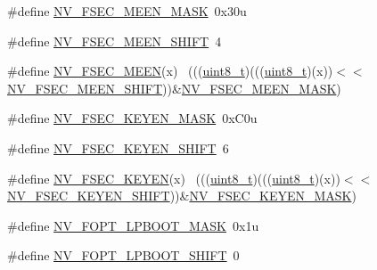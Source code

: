 \begin{DoxyCompactItemize}
\item 
\#define \hyperlink{group___n_v___register___masks_ga02f5aa86e1f5bceefd0378fa736d5656}{N\+V\+\_\+\+F\+S\+E\+C\+\_\+\+M\+E\+E\+N\+\_\+\+M\+A\+SK}~0x30u
\item 
\#define \hyperlink{group___n_v___register___masks_ga13adfbdf46af9e59b446d17ce90b49c1}{N\+V\+\_\+\+F\+S\+E\+C\+\_\+\+M\+E\+E\+N\+\_\+\+S\+H\+I\+FT}~4
\item 
\#define \hyperlink{group___n_v___register___masks_gafb2cb85643ad7aa0997ed49baa90379f}{N\+V\+\_\+\+F\+S\+E\+C\+\_\+\+M\+E\+EN}(x)                                                ~(((\hyperlink{_p_e___types_8h_aba7bc1797add20fe3efdf37ced1182c5}{uint8\+\_\+t})(((\hyperlink{_p_e___types_8h_aba7bc1797add20fe3efdf37ced1182c5}{uint8\+\_\+t})(x))$<$$<$\hyperlink{group___n_v___register___masks_ga13adfbdf46af9e59b446d17ce90b49c1}{N\+V\+\_\+\+F\+S\+E\+C\+\_\+\+M\+E\+E\+N\+\_\+\+S\+H\+I\+FT}))\&\hyperlink{group___n_v___register___masks_ga02f5aa86e1f5bceefd0378fa736d5656}{N\+V\+\_\+\+F\+S\+E\+C\+\_\+\+M\+E\+E\+N\+\_\+\+M\+A\+SK})
\item 
\#define \hyperlink{group___n_v___register___masks_ga50a87e963eeaaf5fdb904e7bac9099af}{N\+V\+\_\+\+F\+S\+E\+C\+\_\+\+K\+E\+Y\+E\+N\+\_\+\+M\+A\+SK}~0x\+C0u
\item 
\#define \hyperlink{group___n_v___register___masks_ga3df55e24a4dc42a19afc15b4a3137bae}{N\+V\+\_\+\+F\+S\+E\+C\+\_\+\+K\+E\+Y\+E\+N\+\_\+\+S\+H\+I\+FT}~6
\item 
\#define \hyperlink{group___n_v___register___masks_ga36512e2f79f5136a62b0f32ad2955c25}{N\+V\+\_\+\+F\+S\+E\+C\+\_\+\+K\+E\+Y\+EN}(x)                                              ~(((\hyperlink{_p_e___types_8h_aba7bc1797add20fe3efdf37ced1182c5}{uint8\+\_\+t})(((\hyperlink{_p_e___types_8h_aba7bc1797add20fe3efdf37ced1182c5}{uint8\+\_\+t})(x))$<$$<$\hyperlink{group___n_v___register___masks_ga3df55e24a4dc42a19afc15b4a3137bae}{N\+V\+\_\+\+F\+S\+E\+C\+\_\+\+K\+E\+Y\+E\+N\+\_\+\+S\+H\+I\+FT}))\&\hyperlink{group___n_v___register___masks_ga50a87e963eeaaf5fdb904e7bac9099af}{N\+V\+\_\+\+F\+S\+E\+C\+\_\+\+K\+E\+Y\+E\+N\+\_\+\+M\+A\+SK})
\item 
\#define \hyperlink{group___n_v___register___masks_gabe7cb388b4a9f41cc264e7df5ecdf883}{N\+V\+\_\+\+F\+O\+P\+T\+\_\+\+L\+P\+B\+O\+O\+T\+\_\+\+M\+A\+SK}~0x1u
\item 
\#define \hyperlink{group___n_v___register___masks_ga2fc27fe10cf14eb30613e131fe7e758e}{N\+V\+\_\+\+F\+O\+P\+T\+\_\+\+L\+P\+B\+O\+O\+T\+\_\+\+S\+H\+I\+FT}~0
\item 

\end{DoxyCompactItemize}
